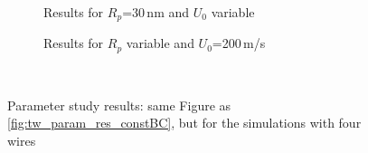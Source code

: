 \begin{figure}
            \begin{subfigure}{0.49\textwidth}
                  \flushleft
                  \caption{Results for $R_{p}$=30\,nm and $U_{0}$ variable}\label{subfig:fw_periodicBC_U0_var}
          \end{subfigure}\hfill
        \begin{subfigure}{0.49\textwidth}
                \flushright
                \caption{Results for $R_{p}$ variable and $U_{0}$=200\,\textmu m/s}\label{subfig:fw_periodicBC_Rp_var}
        \end{subfigure}
        \\
        
         \caption[Parameter study results of the simulated retention of nanoparticles on four wires with a periodic boundary condition at the channel walls]{Parameter study results: same Figure as \ref{fig:tw_param_res_constBC}, but for the simulations with four wires}
        \label{fig:fw_param_res_periodicBC}
  \end{figure} 

